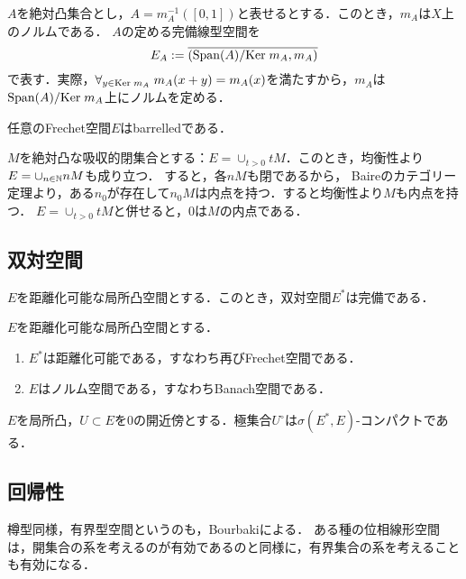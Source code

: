 \documentclass[uplatex,dvipdfmx]{jsreport}
\begin{document}
\begin{notation}
    $A$を絶対凸集合とし，$A=m_A^{-1}([0,1])$と表せるとする．このとき，$m_A$は$X$上のノルムである．
    $A$の定める完備線型空間を
    \[E_A:=\overline{\left(\mathrm{Span}(A)/\mathrm{Ker}\; m_A,m_A\right)}\]
    で表す．実際，$\forall_{y\in\mathrm{Ker}\; m_A}\;m_A(x+y)=m_A(x)$を満たすから，$m_A$は$\mathrm{Span}(A)/\mathrm{Ker}\; m_A$上にノルムを定める．
\end{notation}

\begin{proposition}
    任意のFrechet空間$E$はbarrelledである．
\end{proposition}
\begin{Proof}
    $M$を絶対凸な吸収的閉集合とする：$E=\cup_{t>0}tM$．このとき，均衡性より$E=\cup_{n\in\mathbb{N}}nM$も成り立つ．
    すると，各$nM$も閉であるから，
    Baireのカテゴリー定理より，ある$n_0$が存在して$n_0M$は内点を持つ．すると均衡性より$M$も内点を持つ．
    $E=\cup_{t>0}tM$と併せると，$0$は$M$の内点である．
\end{Proof}

\subsection{双対空間}

\begin{theorem}
    $E$を距離化可能な局所凸空間とする．このとき，双対空間$E^*$は完備である．
\end{theorem}

\begin{corollary}
    $E$を距離化可能な局所凸空間とする．
    \begin{enumerate}
        \item $E^*$は距離化可能である，すなわち再びFrechet空間である．
        \item $E$はノルム空間である，すなわちBanach空間である．
    \end{enumerate}
\end{corollary}

\begin{theorem}
    $E$を局所凸，$U\subset E$を$0$の開近傍とする．極集合$U^\circ$は$\sigma(E^*,E)$-コンパクトである．
\end{theorem}

\subsection{回帰性}

\begin{tcolorbox}[colframe=ForestGreen, colback=ForestGreen!10!white,breakable,colbacktitle=ForestGreen!40!white,coltitle=black,fonttitle=\bfseries\sffamily,
title=]
    樽型同様，有界型空間というのも，Bourbakiによる．
    ある種の位相線形空間は，開集合の系を考えるのが有効であるのと同様に，有界集合の系を考えることも有効になる．
\end{tcolorbox}
\end{document}
